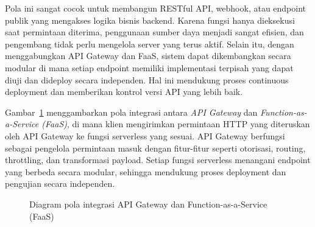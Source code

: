 Pola ini sangat cocok untuk membangun RESTful API, webhook, atau endpoint publik yang mengakses logika bisnis backend. Karena fungsi hanya dieksekusi saat permintaan diterima, penggunaan sumber daya menjadi sangat efisien, dan pengembang tidak perlu mengelola server yang terus aktif. Selain itu, dengan menggabungkan API Gateway dan FaaS, sistem dapat dikembangkan secara modular di mana setiap endpoint memiliki implementasi terpisah yang dapat diuji dan dideploy secara independen. Hal ini mendukung proses continuous deployment dan memberikan kontrol versi API yang lebih baik.

Gambar~\ref{fig:api-gateway-faas} menggambarkan pola integrasi antara \textit{API Gateway} dan \textit{Function-as-a-Service (FaaS)}, di mana klien mengirimkan permintaan HTTP yang diteruskan oleh API Gateway ke fungsi serverless yang sesuai. API Gateway berfungsi sebagai pengelola permintaan masuk dengan fitur-fitur seperti otorisasi, routing, throttling, dan transformasi payload. Setiap fungsi serverless menangani endpoint yang berbeda secara modular, sehingga mendukung proses deployment dan pengujian secara independen.

\begin{figure}
	\centering
	\caption{Diagram pola integrasi API Gateway dan Function-as-a-Service (FaaS)}
	\label{fig:api-gateway-faas}
\end{figure}


